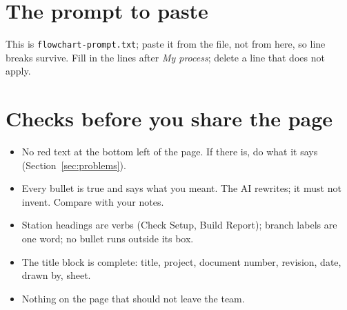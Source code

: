 \documentclass[10pt]{article}
\newcommand{\file}[1]{\texttt{#1}}
\begin{document}
\section{The prompt to paste}\label{sec:prompt}
This is \file{flowchart-prompt.txt}; paste it from the file, not from here, so line breaks survive. Fill in the lines after \emph{My process}; delete a line that does not apply.

\section{Checks before you share the page}\label{sec:checks}
\begin{itemize}
\item No red text at the bottom left of the page. If there is, do what it says (Section~\ref{sec:problems}).
\item Every bullet is true and says what you meant. The AI rewrites; it must not invent. Compare with your notes.
\item Station headings are verbs (Check Setup, Build Report); branch labels are one word; no bullet runs outside its box.
\item The title block is complete: title, project, document number, revision, date, drawn by, sheet.
\item Nothing on the page that should not leave the team.
\end{itemize}
\end{document}
